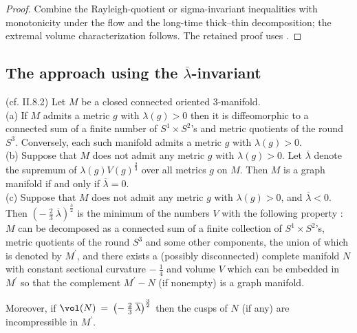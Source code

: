 \begin{proof}
\sketch Combine the Rayleigh-quotient or sigma-invariant inequalities with monotonicity under the flow and the long-time thick--thin decomposition; the extremal volume characterization follows.
The retained proof uses \cite[Pf. of Theorem 2.9]{Anderson}.
\end{proof}

\subsection{The approach using the $\overline{\lambda}$-invariant}

\begin{proposition}
  \label{prop:kl-alternative-proof-cusp-incompressibility-characterization-graph-manifolds-2}
 (cf. II.8.2) \label{propII.8.2}
Let $M$ be a closed connected oriented $3$-manifold. \\
(a) If $M$ admits a metric $g$ with $\lambda(g) > 0$ then it is
diffeomorphic to a connected sum of a finite number of
$S^1 \times S^2$'s and metric quotients of the round $S^3$.
Conversely, each such manifold admits a metric $g$ with
$\lambda(g) > 0$. \\
(b) Suppose that $M$ does not admit any metric $g$ with
$\lambda(g) > 0$. Let $\overline{\lambda}$ denote the
supremum of $\lambda(g) V(g)^{\frac23}$ over all metrics $g$ on $M$.
Then $M$ is a graph manifold if and only if $\overline{\lambda}
= 0$. \\
(c) Suppose that $M$ does not admit any metric $g$ with
$\lambda(g) > 0$, and $\overline{\lambda} < 0$.
Then
$\left( - \: \frac23 \: \overline{\lambda}
\right)^{\frac32}$ is the minimum
of the numbers
$V$ with the following property : $M$ can be decomposed as a connected sum
of a finite collection of $S^1 \times S^2$'s, metric quotients of the round
$S^3$ and some other components, the union of which is denoted by
$M^\prime$, and there exists a (possibly disconnected) complete
manifold $N$ with constant sectional curvature $- \: \frac14$ and
volume $V$ which can be embedded in $M^\prime$ so that the
complement $M^\prime - N$ (if nonempty) is a graph manifold.

Moreover, if
$\vol(N) \: = \: \left( - \: \frac23 \: \overline{\lambda}
\right)^{\frac32}$
then the cusps of $N$ (if any) are incompressible in $M^\prime$.
\end{proposition}

